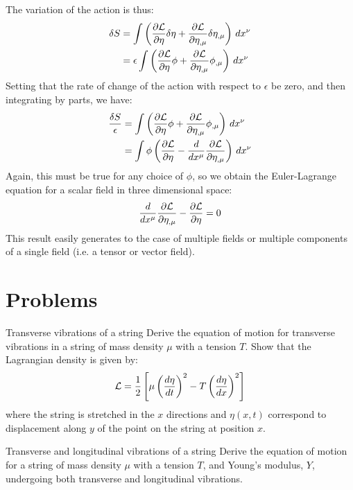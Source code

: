 The variation of the action is thus:
\begin{align}
\delta S&=\int\left(\frac{\partial \mathcal{L}}{\partial \eta}\delta\eta+\frac{\partial \mathcal{L}}{\partial \eta_{,\mu}}\delta\eta_{,\mu}\right)\,dx^\nu\nonumber\\
&=\epsilon\int\left(\frac{\partial \mathcal{L}}{\partial \eta}\phi+\frac{\partial \mathcal{L}}{\partial \eta_{,\mu}}\phi_{,\mu}\right)\,dx^\nu
\end{align}
Setting that the rate of change of the action with respect to $\epsilon$ be zero, and then integrating by parts, we have:
\begin{align}
\frac{\delta S}{\epsilon}&=\int\left(\frac{\partial \mathcal{L}}{\partial \eta}\phi+\frac{\partial \mathcal{L}}{\partial \eta_{,\mu}}\phi_{,\mu}\right)\,dx^\nu\nonumber\\
&=\int\phi\left(\frac{\partial \mathcal{L}}{\partial \eta}-\frac{d}{dx^\mu}\frac{\partial \mathcal{L}}{\partial \eta_{,\mu}}\right)\,dx^\nu\nonumber
\end{align}
Again, this must be true for any choice of $\phi$, so we obtain the Euler-Lagrange equation for a scalar field in three dimensional space:
\begin{align}
\frac{d}{dx^\mu}\frac{\partial \mathcal{L}}{\partial \eta_{,\mu}}-\frac{\partial \mathcal{L}}{\partial \eta}=0
\end{align}
This result easily generates to the case of multiple fields or multiple components of a single field (i.e. a tensor or vector field). 


\section{Problems}
\begin{problem}{Transverse vibrations of a string}
Derive the equation of motion for transverse vibrations in a string of mass density $\mu$ with a tension $T$. Show that the Lagrangian density is given by:
\begin{align*}
\mathcal{L}=\frac{1}{2}\left[\mu\left(\frac{d\eta}{dt}\right)^2-T\left(\frac{d\eta}{dx}\right)^2\right]
\end{align*}
where the string is stretched in the $x$ directions and $\eta(x,t)$ correspond to displacement along $y$ of the point on the string at position $x$.
\end{problem}

\begin{problem}{Transverse and longitudinal vibrations of a string}
Derive the equation of motion for a string of mass density $\mu$ with a tension $T$, and Young's modulus, $Y$, undergoing both transverse and longitudinal vibrations. 
\end{problem}